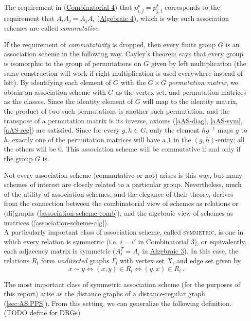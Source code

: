 \documentclass{report}
\begin{document}
    The requirement in (\hyperref[cAS-reg]{Combinatorial 4}) that $p_{i, j}^k =
    p_{j, i}^k$ corresponds to the requirement that $A_i A_j = A_j A_i$
    (\hyperref[aAS-reg]{Algebraic 4}), which is why such association schemes are
    called \textit{commutative}.

    If the requirement of \textit{commutativity} is dropped, then every finite
    group $G$ is an association scheme in the following way.  Cayley's theorem
    says that every group is isomorphic to the group of permutations on $G$
    given by left multiplication (the same construction will work if right
    multiplication is used everywhere instead of left).  By identifying each
    element of $G$ with the $G \times G$ \textit{permutation matrix}, we obtain
    an association scheme with $G$ as the vertex set, and permutation matrices
    as the classes.  Since the identity element of $G$ will map to the identity
    matrix, the product of two such permutations is another such permutation,
    and the transpose of a permutation matrix is its inverse, axioms
    (\ref{aAS-diag}, \ref{aAS-sym}, \ref{aAS-reg}) are satisfied.  Since for
    every $g, h \in G$, only the element $hg^{-1}$ maps $g$ to $h$, exactly one
    of the permutation matrices will have a $1$ in the $(g, h)$-entry; all the
    others will be $0$.  This association scheme will be commutative if and only
    if the group $G$ is.

    Not every association scheme (commutative or not) arises is this way, but
    many schemes of interest are closely related to a particular group.
    Nevertheless, much of the utility of association schemes, and the elegance
    of their theory, derives from the connection between the combinatorial view
    of schemes as relations or (di)graphs (\ref{association-scheme-comb}), and
    the algebraic view of schemes as matrices (\ref{association-scheme-alg}).
    \\

    A particularly important class of association scheme, called
    \textsc{symmetric}, is one in which every relation is symmetric (i.e. $i =
    i'$ in \hyperref[cAS-sym]{Combinatorial 3}), or equivalently, each adjacency
    matrix is symmetric ($A_i^T = A_i$ in \hyperref[aAS-sym]{Algebraic 3}).
    In this case, the relations $R_i$ form \textit{undirected} graphs $\Gamma_i$
    with vertex set $X$, and edge set given by
    $$
      x \sim y \iff (x, y) \in R_i \iff (y, x) \in R_i
      \ .
    $$

    The most important class of symmetric association scheme (for the purposes
    of this report) arise as the distance graphs of a distance-regular graph
    (\ref{sec:AS:PPS}).  From this setting, we can generalize the following
    definition.  (TODO define for DRGs)
\end{document}
